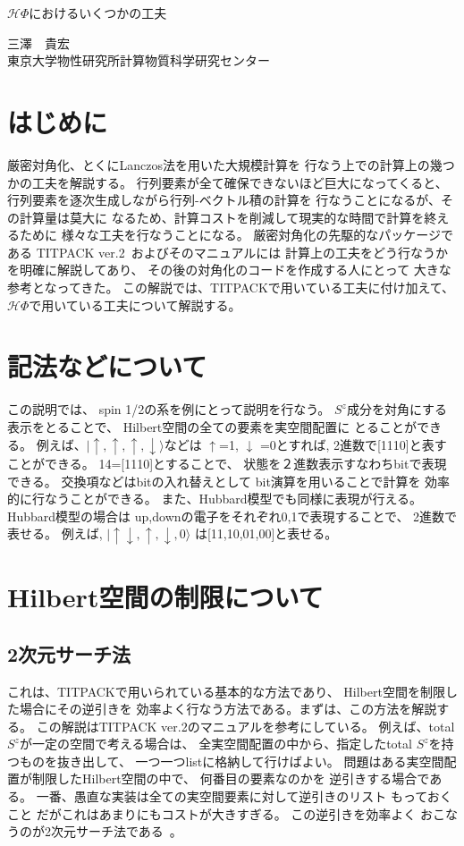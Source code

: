 \documentclass[prb,aps,showpacs,preprint,nofootinbib]{revtex4}
\newcommand{\up}{\uparrow}
\newcommand{\down}{\downarrow}
\newcommand{\HPhi}{\mathcal{H}\Phi}
\begin{document}
\begin{center}\LARGE
$\mathcal H\Phi$におけるいくつかの工夫
\end{center}
\begin{flushright}\large
三澤　貴宏 \\
東京大学物性研究所計算物質科学研究センター
\end{flushright}

\section{はじめに}
\label{sec:intro}
厳密対角化、とくにLanczos法を用いた大規模計算を
行なう上での計算上の幾つかの工夫を解説する。
行列要素が全て確保できないほど巨大になってくると、
行列要素を逐次生成しながら行列-ベクトル積の計算を
行なうことになるが、その計算量は莫大に
なるため、計算コストを削減して現実的な時間で計算を終えるために
様々な工夫を行なうことになる。
厳密対角化の先駆的なパッケージである
TITPACK ver.2~\cite{titpack}およびそのマニュアルには
計算上の工夫をどう行なうかを明確に解説してあり、
その後の対角化のコードを作成する人にとって
大きな参考となってきた。
この解説では、TITPACKで用いている工夫に付け加えて、
$\HPhi$で用いている工夫について解説する。

\section{記法などについて}
この説明では、
spin 1/2の系を例にとって説明を行なう。
$S^{z}$成分を対角にする表示をとることで、
Hilbert空間の全ての要素を実空間配置に
とることができる。
例えば、$|\up,\up,\up,\down\rangle$などは
$\up$=1, $\down$ =0とすれば,
2進数で[1110]と表すことができる。
14=[1110]とすることで、
状態を２進数表示すなわちbitで表現できる。
交換項などはbitの入れ替えとして
bit演算を用いることで計算を
効率的に行なうことができる。
また、Hubbard模型でも同様に表現が行える。
Hubbard模型の場合は
up,downの電子をそれぞれ0,1で表現することで、
2進数で表せる。
例えば, $|\up\down,\up,\down,0\rangle$
は[11,10,01,00]と表せる。


\section{Hilbert空間の制限について}
\subsection{2次元サーチ法}
\label{sec:OgataLin}
これは、TITPACKで用いられている基本的な方法であり、
Hilbert空間を制限した場合にその逆引きを
効率よく行なう方法である。まずは、この方法を解説する。
この解説はTITPACK ver.2のマニュアルを参考にしている。
例えば、total $S^z$が一定の空間で考える場合は、
全実空間配置の中から、指定したtotal
$S^z$を持つものを抜き出して、
一つ一つlistに格納して行けばよい。
問題はある実空間配置が制限したHilbert空間の中で、
何番目の要素なのかを
逆引きする場合である。
一番、愚直な実装は全ての実空間要素に対して逆引きのリスト
もっておくこと
だがこれはあまりにもコストが大きすぎる。
この逆引きを効率よく
おこなうのが2次元サーチ法である~\cite{Lin,titpack}。
\end{document}
